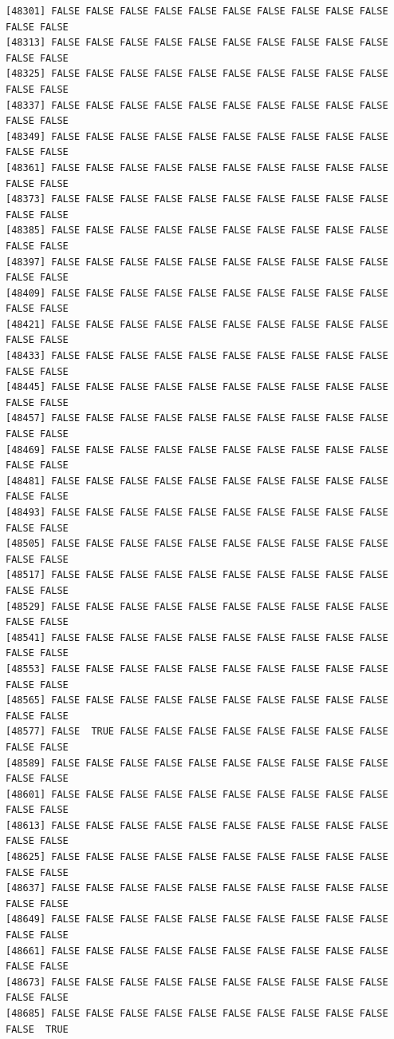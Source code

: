 \documentclass[
  a4paper,
  DIV=11,
  numbers=noendperiod]{scrartcl}
\begin{document}
\begin{verbatim}
[48301] FALSE FALSE FALSE FALSE FALSE FALSE FALSE FALSE FALSE FALSE FALSE FALSE
[48313] FALSE FALSE FALSE FALSE FALSE FALSE FALSE FALSE FALSE FALSE FALSE FALSE
[48325] FALSE FALSE FALSE FALSE FALSE FALSE FALSE FALSE FALSE FALSE FALSE FALSE
[48337] FALSE FALSE FALSE FALSE FALSE FALSE FALSE FALSE FALSE FALSE FALSE FALSE
[48349] FALSE FALSE FALSE FALSE FALSE FALSE FALSE FALSE FALSE FALSE FALSE FALSE
[48361] FALSE FALSE FALSE FALSE FALSE FALSE FALSE FALSE FALSE FALSE FALSE FALSE
[48373] FALSE FALSE FALSE FALSE FALSE FALSE FALSE FALSE FALSE FALSE FALSE FALSE
[48385] FALSE FALSE FALSE FALSE FALSE FALSE FALSE FALSE FALSE FALSE FALSE FALSE
[48397] FALSE FALSE FALSE FALSE FALSE FALSE FALSE FALSE FALSE FALSE FALSE FALSE
[48409] FALSE FALSE FALSE FALSE FALSE FALSE FALSE FALSE FALSE FALSE FALSE FALSE
[48421] FALSE FALSE FALSE FALSE FALSE FALSE FALSE FALSE FALSE FALSE FALSE FALSE
[48433] FALSE FALSE FALSE FALSE FALSE FALSE FALSE FALSE FALSE FALSE FALSE FALSE
[48445] FALSE FALSE FALSE FALSE FALSE FALSE FALSE FALSE FALSE FALSE FALSE FALSE
[48457] FALSE FALSE FALSE FALSE FALSE FALSE FALSE FALSE FALSE FALSE FALSE FALSE
[48469] FALSE FALSE FALSE FALSE FALSE FALSE FALSE FALSE FALSE FALSE FALSE FALSE
[48481] FALSE FALSE FALSE FALSE FALSE FALSE FALSE FALSE FALSE FALSE FALSE FALSE
[48493] FALSE FALSE FALSE FALSE FALSE FALSE FALSE FALSE FALSE FALSE FALSE FALSE
[48505] FALSE FALSE FALSE FALSE FALSE FALSE FALSE FALSE FALSE FALSE FALSE FALSE
[48517] FALSE FALSE FALSE FALSE FALSE FALSE FALSE FALSE FALSE FALSE FALSE FALSE
[48529] FALSE FALSE FALSE FALSE FALSE FALSE FALSE FALSE FALSE FALSE FALSE FALSE
[48541] FALSE FALSE FALSE FALSE FALSE FALSE FALSE FALSE FALSE FALSE FALSE FALSE
[48553] FALSE FALSE FALSE FALSE FALSE FALSE FALSE FALSE FALSE FALSE FALSE FALSE
[48565] FALSE FALSE FALSE FALSE FALSE FALSE FALSE FALSE FALSE FALSE FALSE FALSE
[48577] FALSE  TRUE FALSE FALSE FALSE FALSE FALSE FALSE FALSE FALSE FALSE FALSE
[48589] FALSE FALSE FALSE FALSE FALSE FALSE FALSE FALSE FALSE FALSE FALSE FALSE
[48601] FALSE FALSE FALSE FALSE FALSE FALSE FALSE FALSE FALSE FALSE FALSE FALSE
[48613] FALSE FALSE FALSE FALSE FALSE FALSE FALSE FALSE FALSE FALSE FALSE FALSE
[48625] FALSE FALSE FALSE FALSE FALSE FALSE FALSE FALSE FALSE FALSE FALSE FALSE
[48637] FALSE FALSE FALSE FALSE FALSE FALSE FALSE FALSE FALSE FALSE FALSE FALSE
[48649] FALSE FALSE FALSE FALSE FALSE FALSE FALSE FALSE FALSE FALSE FALSE FALSE
[48661] FALSE FALSE FALSE FALSE FALSE FALSE FALSE FALSE FALSE FALSE FALSE FALSE
[48673] FALSE FALSE FALSE FALSE FALSE FALSE FALSE FALSE FALSE FALSE FALSE FALSE
[48685] FALSE FALSE FALSE FALSE FALSE FALSE FALSE FALSE FALSE FALSE FALSE  TRUE

\end{verbatim}
\end{document}
